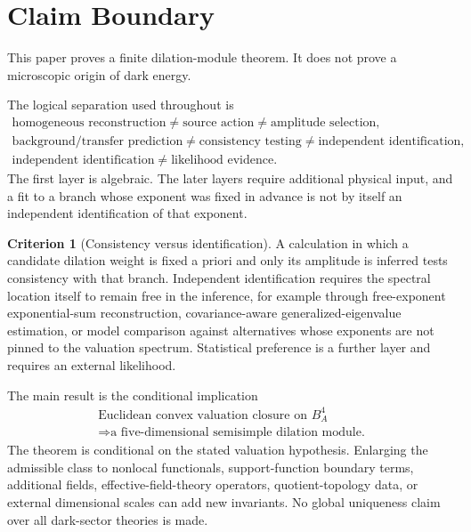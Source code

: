 \documentclass[aps,prd,reprint,onecolumn,nofootinbib,superscriptaddress,showkeys]{revtex4-2}
\numberwithin{equation}{section}
\theoremstyle{definition}
\newtheorem{criterion}{Criterion}[section]
\theoremstyle{plain}
\newcommand{\Bfour}{B^4}
\begin{document}

\maketitle

\section{Claim Boundary}

This paper proves a finite dilation-module theorem.  It does not prove a microscopic origin of dark energy.

The logical separation used throughout is
\begin{equation}
\boxed{
\begin{gathered}
\text{homogeneous reconstruction}\neq\text{source action}\neq\text{amplitude selection},\\
\text{background/transfer prediction}\neq\text{consistency testing}\neq\text{independent identification},\\
\text{independent identification}\neq\text{likelihood evidence}.
\end{gathered}}
\end{equation}
The first layer is algebraic.  The later layers require additional physical input, and a fit to a branch whose exponent was fixed in advance is not by itself an independent identification of that exponent.

\begin{criterion}[Consistency versus identification]\label{crit:identification}
A calculation in which a candidate dilation weight is fixed a priori and only its amplitude is inferred tests consistency with that branch.  Independent identification requires the spectral location itself to remain free in the inference, for example through free-exponent exponential-sum reconstruction, covariance-aware generalized-eigenvalue estimation, or model comparison against alternatives whose exponents are not pinned to the valuation spectrum.  Statistical preference is a further layer and requires an external likelihood.
\end{criterion}

The main result is the conditional implication
\begin{equation}
\boxed{
\begin{gathered}
\text{Euclidean convex valuation closure on }\Bfour_A\\
\Longrightarrow
\text{a five-dimensional semisimple dilation module.}
\end{gathered}}
\end{equation}
The theorem is conditional on the stated valuation hypothesis.  Enlarging the admissible class to nonlocal functionals, support-function boundary terms, additional fields, effective-field-theory operators, quotient-topology data, or external dimensional scales can add new invariants.  No global uniqueness claim over all dark-sector theories is made.
\end{document}
